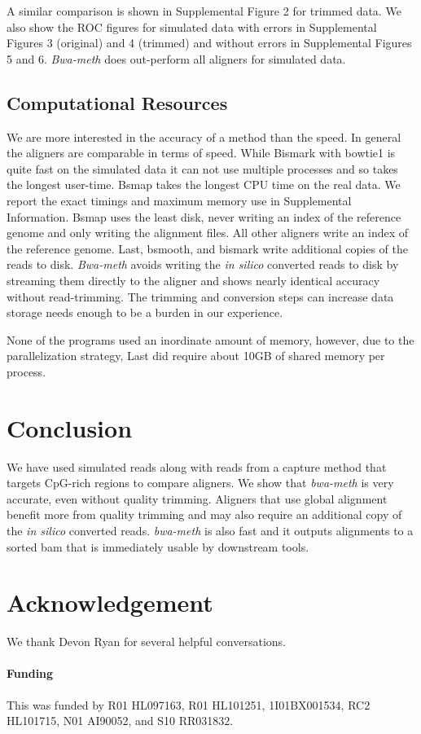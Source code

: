 \documentclass{bioinfo}
\begin{document}
A similar comparison is shown in Supplemental Figure 2 for trimmed data.
We also show the ROC figures for simulated data with errors in Supplemental
Figures 3 (original) and 4 (trimmed) and without errors in Supplemental 
Figures 5 and 6.
\textit{Bwa-meth} does out-perform all aligners for simulated data.

\subsection{Computational Resources}
We are more interested in the accuracy of a
method than the speed. In general the aligners are comparable in terms of
speed. While Bismark with bowtie1 is quite fast on the simulated data it
can not use multiple processes and so takes the longest user-time. Bsmap
takes the longest CPU time on the real data. We report the exact 
timings and maximum memory use in Supplemental Information.
Bsmap uses the least disk, never writing an index of the reference genome
and only writing the alignment files. All other aligners write an index of
the reference genome. Last, bsmooth, and bismark write additional copies of the
reads to disk.
\textit{Bwa-meth} avoids writing the \emph{in silico}
converted reads to disk by streaming them directly to the aligner and shows
nearly identical accuracy without read-trimming. The trimming and conversion
steps can increase data storage needs enough to be a burden in our experience. 

None of the programs used an inordinate amount of memory, however, due to
the parallelization strategy, Last did require about 10GB of shared memory
per process.

\section{Conclusion}
We have used simulated reads along with reads from a capture method that
targets CpG-rich regions to compare aligners.
We show that \textit{bwa-meth} is very accurate, even without quality trimming.
Aligners that use global alignment benefit more from quality trimming and may
also require an additional copy of the \emph{in silico} converted reads.
\textit{bwa-meth} is also fast and it outputs alignments to a sorted bam
that is immediately usable by downstream tools.

\section*{Acknowledgement}
We thank Devon Ryan for several helpful conversations.
\paragraph{Funding\textcolon} This was funded by R01 HL097163, R01 HL101251, 1I01BX001534, RC2 HL101715, N01 AI90052, and S10 RR031832.
%
%
%
%
%
%
%
%
%



    
\end{document}
